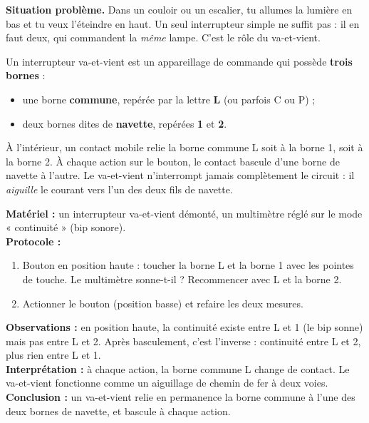 \documentclass[11pt]{article}
\newcommand{\cle}[1]{{\popxbold\color{popdark}#1}}
\newcounter{popsec}
\newcounter{popsub}
\newcommand{\courssub}[1]{%
  \stepcounter{popsub}%
  \par\vspace{9pt}\noindent{\popxbold\fontsize{11.5}{13}\selectfont\color{popink}{\color{poporange}\thepopsec.\thepopsub}\hspace{6pt}#1}\par\nopagebreak\vspace{4pt}
}
\begin{document}
\courssub{L'interrupteur va-et-vient}

\textbf{Situation problème.} Dans un couloir ou un escalier, tu allumes la lumière en bas et tu veux l'éteindre en haut. Un seul interrupteur simple ne suffit pas : il en faut deux, qui commandent la \emph{même} lampe. C'est le rôle du \cle{va-et-vient}.

\begin{definition}
Un \cle{interrupteur va-et-vient} est un appareillage de commande qui possède \textbf{trois bornes} :
\begin{itemize}
\item une borne \textbf{commune}, repérée par la lettre \textbf{L} (ou parfois C ou P) ;
\item deux bornes dites de \textbf{navette}, repérées \textbf{1} et \textbf{2}.
\end{itemize}
À l'intérieur, un contact mobile relie la borne commune L soit à la borne 1, soit à la borne 2. À chaque action sur le bouton, le contact bascule d'une borne de navette à l'autre. Le va-et-vient n'interrompt jamais complètement le circuit : il \emph{aiguille} le courant vers l'un des deux fils de navette.
\end{definition}

\begin{experience}
\textbf{Matériel :} un interrupteur va-et-vient démonté, un multimètre réglé sur le mode « continuité » (bip sonore).\\
\textbf{Protocole :}
\begin{enumerate}
\item Bouton en position haute : toucher la borne L et la borne 1 avec les pointes de touche. Le multimètre sonne-t-il ? Recommencer avec L et la borne 2.
\item Actionner le bouton (position basse) et refaire les deux mesures.
\end{enumerate}
\textbf{Observations :} en position haute, la continuité existe entre L et 1 (le bip sonne) mais pas entre L et 2. Après basculement, c'est l'inverse : continuité entre L et 2, plus rien entre L et 1.\\
\textbf{Interprétation :} à chaque action, la borne commune L change de contact. Le va-et-vient fonctionne comme un aiguillage de chemin de fer à deux voies.\\
\textbf{Conclusion :} un va-et-vient relie en permanence la borne commune à l'une des deux bornes de navette, et bascule à chaque action.
\end{experience}
\end{document}

